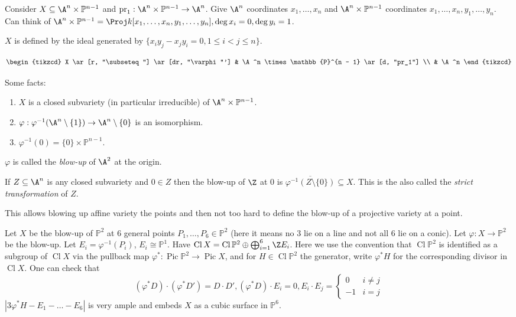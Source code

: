\documentclass[a4paper]{article}
\renewcommand*{\P}{\mathbb{P}}
\DeclareMathOperator{\Pic}{Pic} %
\DeclareMathOperator{\Cl}{Cl} %
\begin{document}
Consider \(X \subseteq \A^n \times \P^{n - 1}\) and \(\mathrm{pr}_1: \A^n \times \P^{n - 1} \to \A^n\). Give \(\A^n\) coordinates \(x_1, \dots, x_n\) and \(\A^n \times \P^{n - 1}\) coordinates \(x_1, \dots, x_n, y_1, \dots, y_n\). Can think of \(\A^n \times \P^{n - 1} = \Proj k[x_1, \dots, x_n, y_1, \dots, y_n], \deg x_i = 0, \deg y_i = 1\).

\(X\) is defined by the ideal generated by \(\{x_iy_j - x_j y_i = 0, 1 \leq i < j \leq n\}\).

\[
  \begin{tikzcd}
    X \ar[r, "\subseteq"] \ar[dr, "\varphi"'] & \A^n \times \P^{n - 1} \ar[d, "pr_1"] \\
    & \A^n
  \end{tikzcd}
\]

Some facts:
\begin{enumerate}
\item \(X\) is a closed subvariety (in particular irreducible) of \(\A^n \times \P^{n - 1}\).
\item \(\varphi: \varphi^{-1}(\A^n \setminus \{1\}) \to \A^n \setminus \{0\}\) is an isomorphism.
\item \(\varphi^{-1}(0) = \{0\} \times \P^{n - 1}\).
\end{enumerate}
\(\varphi\) is called the \emph{blow-up} of \(\A^2\) at the origin.

If \(Z \subseteq \A^n\) is any closed subvariety and \(0 \in Z\) then the blow-up of \(\Z\) at \(0\) is \(\overline{\varphi^{-1}(Z \setminus \{0\})} \subseteq X\). This is the also called the \emph{strict transformation} of \(Z\).

This allows blowing up affine variety the points and then not too hard to define the blow-up of a projective variety at a point.

\begin{eg}
  Let \(X\) be the blow-up of \(\P^2\) at \(6\) general points \(P_1, \dots, P_6 \in \P^2\) (here it means no \(3\) lie on a line and not all \(6\) lie on a conic). Let \(\varphi: X \to \P^2\) be the blow-up. Let \(E_i = \varphi^{-1}(P_i)\), \(E_i \cong \P^1\). Have \(\Cl X = \Cl \P^2 \oplus \bigoplus_{i = 1}^6 \Z E_i\). Here we use the convention that \(\Cl \P^2\) is identified as a subgroup of \(\Cl X\) via the pullback map \(\varphi^*: \Pic \P^2 \to \Pic X\), and for \(H \in \Cl \P^2\) the generator, write \(\varphi^*H\) for the corresponding divisor in \(\Cl X\). One can check that
  \[
    (\varphi^* D) \cdot (\varphi^* D') = D \cdot D',
    (\varphi^* D) \cdot E_i = 0,
    E_i \cdot E_j =
    \begin{cases}
      0 & i \ne j \\
      -1 & i = j
    \end{cases}
  \]
  \(|3 \varphi^* H - E_1 - \dots - E_6|\) is very ample and embeds \(X\) as a cubic surface in \(\P^6\).
\end{eg}


\printindex
\end{document}
